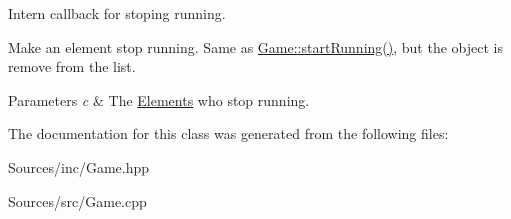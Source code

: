 Intern callback for stoping running. 

Make an element stop running. Same as \hyperlink{class_game_a27ad8f2a6f8f098cc28377df13c4ec2e}{Game\+::start\+Running()}, but the object is remove from the list. 
\begin{DoxyParams}{Parameters}
{\em c} & The \hyperlink{class_elements}{Elements} who stop running. \\
\hline
\end{DoxyParams}


The documentation for this class was generated from the following files\+:\begin{DoxyCompactItemize}
\item 
Sources/inc/Game.\+hpp\item 
Sources/src/Game.\+cpp\end{DoxyCompactItemize}
